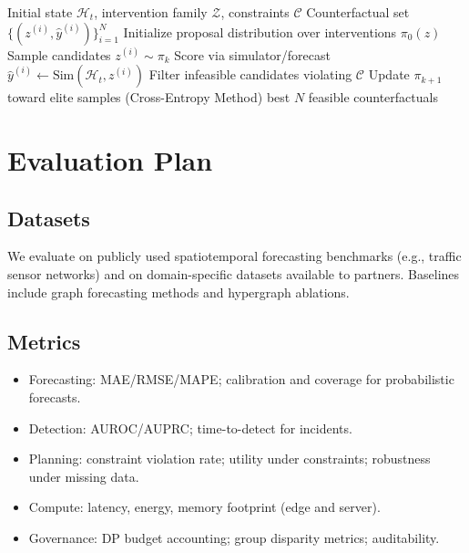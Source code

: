 \documentclass[11pt]{article}
\begin{document}
\begin{algorithm}[t]
\caption{Counterfactual / Digital-Twin Scenario Search (Classical + Optional Quantum)}
\begin{algorithmic}[1]
\Require Initial state $\mathcal{H}_t$, intervention family $\mathcal{Z}$, constraints $\mathcal{C}$
\Ensure Counterfactual set $\{(z^{(i)}, \hat{y}^{(i)})\}_{i=1}^N$
\State Initialize proposal distribution over interventions $\pi_0(z)$
  \State Sample candidates $z^{(i)} \sim \pi_k$
  \State Score via simulator/forecast $\hat{y}^{(i)} \leftarrow \mathrm{Sim}(\mathcal{H}_t, z^{(i)})$
  \State Filter infeasible candidates violating $\mathcal{C}$
  \State Update $\pi_{k+1}$ toward elite samples (Cross-Entropy Method)
\EndFor
\State \Return best $N$ feasible counterfactuals
\end{algorithmic}
\end{algorithm}

\section{Evaluation Plan}

\subsection{Datasets}
We evaluate on publicly used spatiotemporal forecasting benchmarks (e.g., traffic sensor networks) and
on domain-specific datasets available to partners. Baselines include graph forecasting methods and
hypergraph ablations. \citep{li2018dcrnn,yu2018stgcn,feng2019hypergraph}

\subsection{Metrics}
\begin{itemize}[leftmargin=*]
\item Forecasting: MAE/RMSE/MAPE; calibration and coverage for probabilistic forecasts.
\item Detection: AUROC/AUPRC; time-to-detect for incidents.
\item Planning: constraint violation rate; utility under constraints; robustness under missing data.
\item Compute: latency, energy, memory footprint (edge and server).
\item Governance: DP budget accounting; group disparity metrics; auditability.
\end{itemize}
\end{document}
